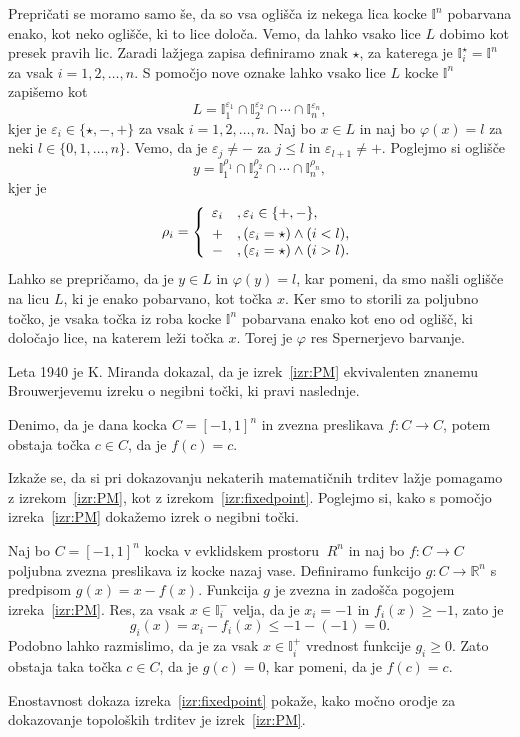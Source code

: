 \documentclass[mat1]{fmfdelo}
\newcommand{\R}{\mathbb R}
\newcommand{\I}{\mathbb I}
\newcommand{\0}{\underline{0}}
\begin{document}
\begin{dokaz}
Prepričati se moramo samo še, da so vsa oglišča iz nekega lica kocke $\I^n$ pobarvana enako, kot neko oglišče, ki to lice določa. Vemo, da lahko vsako lice $L$ dobimo kot presek pravih lic. Zaradi lažjega zapisa definiramo znak $\star$, za katerega je $\I_i^{\star} = \I^n$ za vsak $i = 1, 2, \dots, n$. S pomočjo nove oznake lahko vsako lice $L$ kocke $\I^n$ zapišemo kot 
$$L = \I_1^{\varepsilon_1} \cap \I_2^{\varepsilon_2} \cap \cdots \cap \I_n^{\varepsilon_n},$$
kjer je $\varepsilon_i \in \{ \star, -, + \}$ za vsak $i = 1, 2, \dots, n$. Naj bo $x \in L$ in naj bo $\varphi (x) = l$ za neki $l \in \{ 0, 1, \dots, n \}$. Vemo, da je $\varepsilon_j \neq -$ za $j \leq l$ in $\varepsilon_{l+1} \neq +$. Poglejmo si oglišče 
$$y = \I_1^{\rho_1} \cap \I_2^{\rho_2} \cap \cdots \cap \I_n^{\rho_n},$$
kjer je
\[  \rho_i =  \left\{
\begin{array}{cl}\vspace{3pt}
	\varepsilon_i &, \varepsilon_i \in \{ +, - \},\\
	+ &, (\varepsilon_i = \star) \land (i < l), \\
	- &, (\varepsilon_i = \star) \land (i > l). \\
\end{array} 
\right. \]
Lahko se prepričamo, da je $y \in L$ in $\varphi (y) = l$, kar pomeni, da smo našli oglišče na licu $L$, ki je enako pobarvano, kot točka $x$. Ker smo to storili za poljubno točko, je vsaka točka iz roba kocke $\I^n$ pobarvana enako kot eno od oglišč, ki določajo lice, na katerem leži točka $x$. Torej je $\varphi$ res Spernerjevo barvanje.
\end{dokaz}
Leta 1940 je K. Miranda dokazal, da je izrek~\ref{izr:PM} ekvivalenten znanemu Brouwerjevemu izreku o negibni točki, ki pravi naslednje.
\begin{izrek}\label{izr:fixedpoint}
Denimo, da je dana kocka $C = [-1, 1]^n$ in zvezna preslikava $f : C \to C$, potem obstaja točka $c \in C$, da je $f(c) = c$.
\end{izrek}
Izkaže se, da si pri dokazovanju nekaterih matematičnih trditev lažje pomagamo z izrekom~\ref{izr:PM}, kot z izrekom~\ref{izr:fixedpoint}. Poglejmo si, kako s pomočjo izreka~\ref{izr:PM} dokažemo izrek o negibni točki. 

\begin{dokaz}
Naj bo $C = [-1, 1]^n$ kocka v evklidskem prostoru $~R^n$ in naj bo $f : C \to C$ poljubna zvezna preslikava iz kocke nazaj vase. Definiramo funkcijo $g : C \to \R^n$ s predpisom $g(x) = x - f(x)$. Funkcija $g$ je zvezna in zadošča pogojem izreka~\ref{izr:PM}. Res, za vsak $x \in \I_i^-$ velja, da je $x_i = -1$ in $f_i(x) \geq -1$, zato je 
$$g_i(x) = x_i - f_i(x) \leq -1 - (-1) =0.$$
 Podobno lahko razmislimo, da je za vsak $x \in \I_i^+$ vrednost funkcije $g_i \geq 0$. Zato obstaja taka točka $c \in C$, da je $g(c) = 0$, kar pomeni, da je $f(c) = c$.
\end{dokaz}
Enostavnost dokaza izreka~\ref{izr:fixedpoint} pokaže, kako močno orodje za dokazovanje topoloških trditev je izrek~\ref{izr:PM}.
\end{document}
